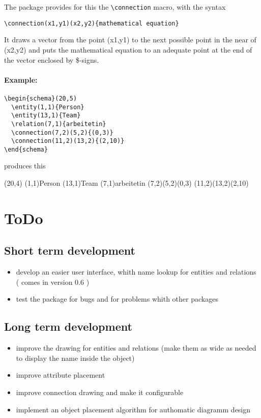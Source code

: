 \documentclass[a4paper,11pt]{article}
\begin{document}
The package provides for this the \verb|\connection| macro, with the syntax

\begin{verbatim}
\connection(x1,y1)(x2,y2){mathematical equation}
\end{verbatim}

It draws a vector from the point (x1,y1) to the next possible point in the near
of (x2,y2) and puts the mathematical equation to an adequate point at the end of the 
vector enclosed by \$-signs. 

\paragraph{Example:}

\begin{verbatim}
\begin{schema}(20,5)
  \entity(1,1){Person}
  \entity(13,1){Team}
  \relation(7,1){arbeitetin}
  \connection(7,2)(5,2){(0,3)}
  \connection(11,2)(13,2){(2,10)}
\end{schema}
\end{verbatim}

produces this

\begin{schema}(20,4)
  \entity(1,1){Person}
  \entity(13,1){Team}
  \relation(7,1){arbeitetin}
  \connection(7,2)(5,2){(0,3)}
  \connection(11,2)(13,2){(2,10)}
\end{schema}

\section{ToDo}

\subsection{Short term development}

\begin{itemize}
\item develop an easier user interface, whith name lookup for entities and
  relations ( comes in version 0.6 )
\item test the package for bugs and for problems whith other packages
\end{itemize}

\subsection{Long term development}

\begin{itemize}
\item improve the drawing for entities and relations (make them as wide as
  needed to display the name inside the object)
\item improve attribute placement
\item improve connection drawing and make it configurable
\item implement an object placement algorithm for authomatic diagramm design
\end{itemize}
\end{document}
